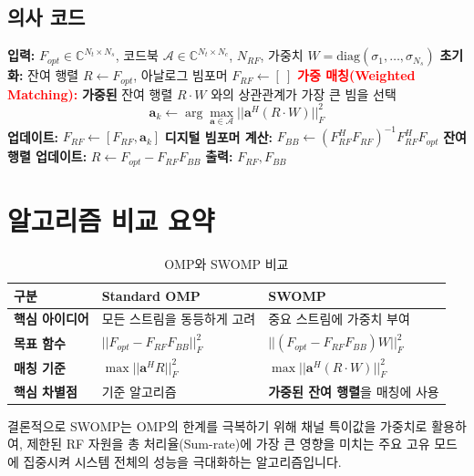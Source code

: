 \documentclass[10pt]{article}
\begin{document}
\subsection{의사 코드}
\begin{algorithm}[H]
    \caption{Simultaneous Weighted OMP (SWOMP)}
    \begin{algorithmic}[1]
        \State \textbf{입력:} $F_{opt} \in \mathbb{C}^{N_t \times N_s}$, 코드북 $\mathcal{A} \in \mathbb{C}^{N_t \times N_c}$, $N_{RF}$, 가중치 $W = \text{diag}(\sigma_1, \dots, \sigma_{N_s})$
        \State \textbf{초기화:} 잔여 행렬 $R \gets F_{opt}$, 아날로그 빔포머 $F_{RF} \gets [\ ]$
            \State \textbf{\textcolor{red}{가중 매칭(Weighted Matching):}} \textbf{가중된} 잔여 행렬 $R \cdot W$ 와의 상관관계가 가장 큰 빔을 선택
            \begin{equation*}
                \mathbf{a}_k \gets \arg\max_{\mathbf{a} \in \mathcal{A}} ||\mathbf{a}^H (R \cdot W)||_F^2
            \end{equation*}
            \State \textbf{업데이트:} $F_{RF} \gets [F_{RF}, \mathbf{a}_k]$
            \State \textbf{디지털 빔포머 계산:} $F_{BB} \gets (F_{RF}^H F_{RF})^{-1} F_{RF}^H F_{opt}$
            \State \textbf{잔여 행렬 업데이트:} $R \gets F_{opt} - F_{RF}F_{BB}$
        \EndFor
        \State \textbf{출력:} $F_{RF}, F_{BB}$
    \end{algorithmic}
\end{algorithm}

\section{알고리즘 비교 요약}

\begin{table}[H]
\centering
\begin{tabular}{|l|l|l|}
\hline
\textbf{구분} & \textbf{Standard OMP} & \textbf{SWOMP} \\ \hline
\textbf{핵심 아이디어} & 모든 스트림을 동등하게 고려 & 중요 스트림에 가중치 부여 \\ \hline
\textbf{목표 함수} & $||F_{opt} - F_{RF}F_{BB}||_F^2$ & $||(F_{opt} - F_{RF}F_{BB})W||_F^2$ \\ \hline
\textbf{매칭 기준} & $\max ||\mathbf{a}^H R||_F^2$ & $\max ||\mathbf{a}^H (R \cdot W)||_F^2$ \\ \hline
\textbf{핵심 차별점} & 기준 알고리즘 & \textbf{가중된 잔여 행렬}을 매칭에 사용 \\ \hline
\end{tabular}
\caption{OMP와 SWOMP 비교}
\end{table}

결론적으로 SWOMP는 OMP의 한계를 극복하기 위해 채널 특이값을 가중치로 활용하여, 제한된 RF 자원을 총 처리율(Sum-rate)에 가장 큰 영향을 미치는 주요 고유 모드에 집중시켜 시스템 전체의 성능을 극대화하는 알고리즘입니다.
\end{document}
